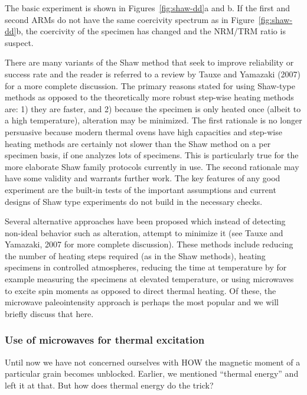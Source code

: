 The basic experiment is shown in Figures~\ref{fig:shaw-dd}a and b.  If the first and second ARMs do not have the same coercivity spectrum as in Figure~\ref{fig:shaw-dd}b, the coercivity of the specimen has changed and the NRM/TRM ratio is suspect.  

There are many variants of the Shaw method that seek to improve reliability or success rate and the reader is referred to a review by 
Tauxe and Yamazaki (2007) for a more complete discussion.
  The primary reasons stated for using Shaw-type methods as opposed to the theoretically more robust step-wise heating methods  are:  1) they are faster, and 2) because the specimen is only heated once (albeit to a high temperature), alteration may be  minimized.    The first rationale is no longer persuasive because modern thermal ovens have high capacities  and step-wise heating methods are certainly not slower than the Shaw method on a per specimen basis, if one analyzes lots of specimens.  This is particularly true for the more elaborate Shaw family protocols currently in use.      The second rationale may have  some validity and warrants further work.  The key features of any good experiment are the built-in tests of the important assumptions and current designs of Shaw type experiments do not build in the necessary checks. 
  

 
  Several alternative approaches have been proposed which instead of detecting non-ideal behavior such as alteration, attempt to minimize it (see
 Tauxe and Yamazaki, 2007 for more complete discussion).  These methods include reducing the number of heating steps required (as in the Shaw methods), heating specimens in controlled atmospheres, reducing the time at temperature by for example measuring the specimens at elevated temperature, or using microwaves to excite spin moments as opposed to direct thermal heating.     Of these, the microwave paleointensity approach is perhaps the most popular and we will briefly discuss that here.  

 
\subsubsection{Use of microwaves for thermal excitation}

Until now we have not concerned ourselves with HOW the magnetic moment of a particular grain becomes unblocked.  Earlier, we mentioned ``thermal energy'' and left it at that. But how does thermal energy do the trick?  

